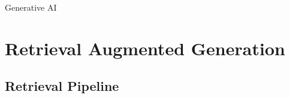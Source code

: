 \documentclass[10pt,a4paper]{article}
\newcommand{\NoteTitle}{Generative AI}
\newcommand{\NoteAuthor}{Thomaskutty Reji}
\begin{document}
\begin{titlepage}
  \vspace*{0.25\textheight}
  {\LARGE \textcolor{tocblue}{\NoteTitle}}\par
  \author{\NoteAuthor}
  \date{}
\end{titlepage}

\label{toc}
\tableofcontents
\newpage


\section{Retrieval Augmented Generation}\label{retrieval-augmented-generation}
\subsection{Retrieval Pipeline}\label{retrieval-pipeline}
\end{document}
